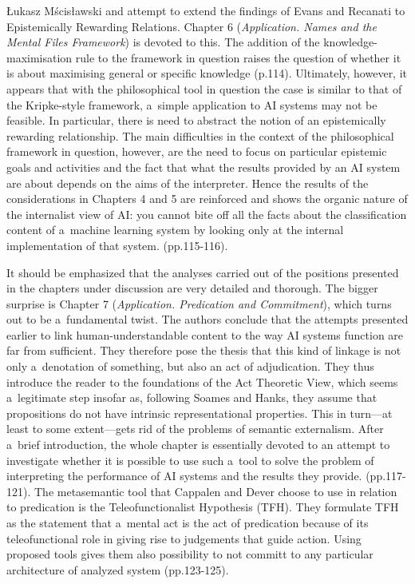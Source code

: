 \begin{newrevengenv}{Łukasz Mścisławski}
{} and attempt to extend the findings of Evans and Recanati to Epistemically Rewarding Relations. Chapter 6 (\textit{Application. Names and the Mental Files Framework}) is devoted to this. The addition of the knowledge-maximisation rule to the framework in question raises the question of whether it is about maximising general or specific knowledge (p.114). Ultimately, however, it appears that with the philosophical tool in question the case is similar to that of the Kripke-style framework, a~simple application to AI systems may not be feasible. In particular, there is need to abstract the notion of an epistemically rewarding relationship. The main difficulties in the context of the philosophical framework in question, however, are the need to focus on particular epistemic goals and activities and the fact that what the results provided by an AI system are about depends on the aims of the interpreter. Hence the results of the considerations in Chapters 4 and 5 are reinforced and shows the organic nature of the internalist view of AI: you cannot bite off all the facts about the classification content of a~machine learning system by looking only at the internal implementation of that system. (pp.115-116).

It should be emphasized that the analyses carried out of the positions presented in the chapters under discussion are very detailed and thorough. The bigger surprise is Chapter 7 (\textit{Application. Predication and Commitment}), which turns out to be a~fundamental twist. The authors conclude that the attempts presented earlier to link human-understandable content to the way AI systems function are far from sufficient. They therefore pose the thesis that this kind of linkage is not only a~denotation of something, but also an act of adjudication. They thus introduce the reader to the foundations of the Act Theoretic View, which seems a~legitimate step insofar as, following Soames and Hanks, they assume that propositions do not have intrinsic representational properties. This in turn---at least to some extent---gets rid of the problems of semantic externalism. After a~brief introduction, the whole chapter is essentially devoted to an attempt to investigate whether it is possible to use such a~tool to solve the problem of interpreting the performance of AI systems and the results they provide. (pp.117-121). The metasemantic tool that Cappalen and Dever choose to use in relation to predication is the Teleofunctionalist Hypothesis (TFH). They formulate TFH as the statement that a~mental act is the act of predication because of its teleofunctional role in giving rise to judgements that guide action. Using proposed tools gives them also possibility to not committ to any particular architecture of analyzed system (pp.123-125).


\end{newrevengenv}
